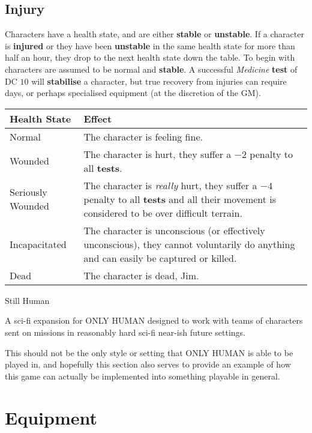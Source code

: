 \documentclass[11pt]{article}
\begin{document}
\begin{multicols}{3}
  \subsection*{Injury}

  Characters have a health state, and are either \textbf{stable} or \textbf{unstable}. If a character is \textbf{injured} or they have been \textbf{unstable} in the same health state for more than half an hour, they drop to the next health state down the table. To begin with characters are assumed to be normal and \textbf{stable}. A successful \textit{Medicine} \textbf{test} of DC $10$ will \textbf{stabilise} a character, but true recovery from injuries can require days, or perhaps specialised equipment (at the discretion of the GM).

  \begin{tabularx}{\linewidth}{lX}
    Health State & Effect \\
    \hline
    Normal & The character is feeling fine. \\
    Wounded & The character is hurt, they suffer a $-2$ penalty to all \textbf{tests}. \\
    Seriously Wounded & The character is \textit{really} hurt, they suffer a $-4$ penalty to all \textbf{tests} and all their movement is considered to be over difficult terrain. \\
    Incapacitated & The character is unconscious (or effectively unconscious), they cannot voluntarily do anything and can easily be captured or killed. \\
    Dead & The character is dead, Jim.
  \end{tabularx}

  \begin{center}\LARGE Still Human \end{center}

  A sci-fi expansion for ONLY HUMAN designed to work with teams of characters sent on missions in reasonably hard sci-fi near-ish future settings.

  This should not be the only style or setting that ONLY HUMAN is able to be played in, and hopefully this section also serves to provide an example of how this game can actually be implemented into something playable in general.

  \section*{Equipment}


\end{multicols}
\end{document}
